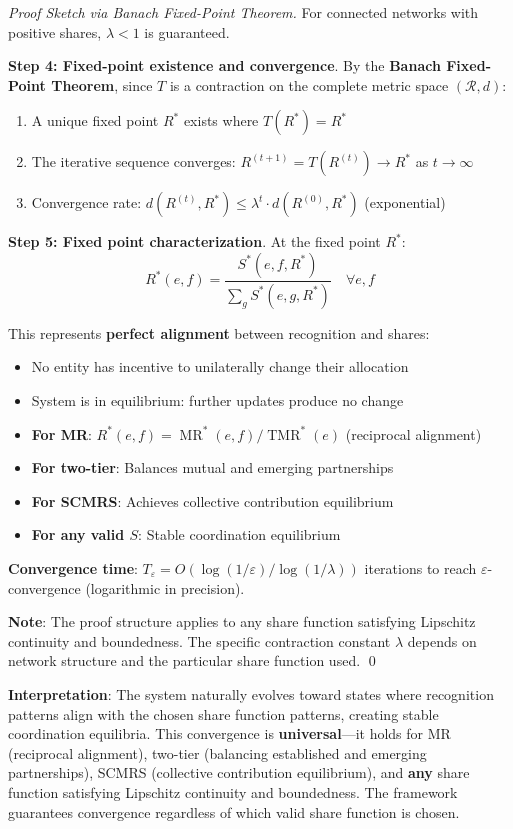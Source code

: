 \documentclass[11pt,a4paper]{article}
\theoremstyle{definition}
\theoremstyle{remark}
\DeclareMathOperator{\TMR}{TMR}
\DeclareMathOperator{\MR}{MR}
\begin{document}
\begin{proof}[Proof Sketch via Banach Fixed-Point Theorem]
For connected networks with positive shares, $\lambda < 1$ is guaranteed.

\textbf{Step 4: Fixed-point existence and convergence}. By the \textbf{Banach Fixed-Point Theorem}, since $T$ is a contraction on the complete metric space $(\mathcal{R}, d)$:
\begin{enumerate}
\item A unique fixed point $R^*$ exists where $T(R^*) = R^*$
\item The iterative sequence converges: $R^{(t+1)} = T(R^{(t)}) \to R^*$ as $t \to \infty$
\item Convergence rate: $d(R^{(t)}, R^*) \le \lambda^t \cdot d(R^{(0)}, R^*)$ (exponential)
\end{enumerate}

\textbf{Step 5: Fixed point characterization}. At the fixed point $R^*$:
\[ R^*(e,f) = \frac{S^*(e,f,R^*)}{\sum_g S^*(e,g,R^*)} \quad \forall e,f \]

This represents \textbf{perfect alignment} between recognition and shares:
\begin{itemize}
\item No entity has incentive to unilaterally change their allocation
\item System is in equilibrium: further updates produce no change
\item \textbf{For MR}: $R^*(e,f) = \MR^*(e,f) / \TMR^*(e)$ (reciprocal alignment)
\item \textbf{For two-tier}: Balances mutual and emerging partnerships
\item \textbf{For SCMRS}: Achieves collective contribution equilibrium
\item \textbf{For any valid $S$}: Stable coordination equilibrium
\end{itemize}

\textbf{Convergence time}: $T_\varepsilon = O(\log(1/\varepsilon) / \log(1/\lambda))$ iterations to reach $\varepsilon$-convergence (logarithmic in precision).

\textbf{Note}: The proof structure applies to any share function satisfying Lipschitz continuity and boundedness. The specific contraction constant $\lambda$ depends on network structure and the particular share function used. \qed
\end{proof}

\textbf{Interpretation}: The system naturally evolves toward states where recognition patterns align with the chosen share function patterns, creating stable coordination equilibria. This convergence is \textbf{universal}---it holds for MR (reciprocal alignment), two-tier (balancing established and emerging partnerships), SCMRS (collective contribution equilibrium), and \textbf{any} share function satisfying Lipschitz continuity and boundedness. The framework guarantees convergence regardless of which valid share function is chosen.
\end{document}
